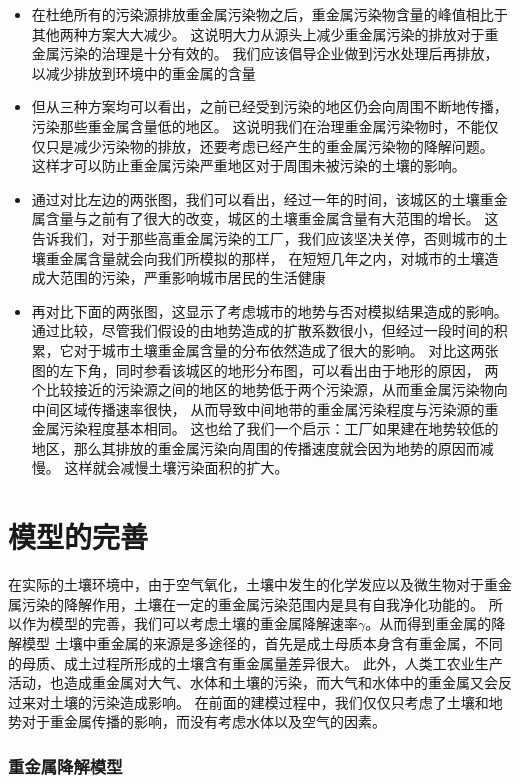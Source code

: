 \documentclass[a4paper]{article}
\begin{document}
\begin{itemize}
\item 在杜绝所有的污染源排放重金属污染物之后，重金属污染物含量的峰值相比于其他两种方案大大减少。
这说明大力从源头上减少重金属污染的排放对于重金属污染的治理是十分有效的。
我们应该倡导企业做到污水处理后再排放，以减少排放到环境中的重金属的含量
\item 但从三种方案均可以看出，之前已经受到污染的地区仍会向周围不断地传播，污染那些重金属含量低的地区。
这说明我们在治理重金属污染物时，不能仅仅只是减少污染物的排放，还要考虑已经产生的重金属污染物的降解问题。
这样才可以防止重金属污染严重地区对于周围未被污染的土壤的影响。
\item 通过对比左边的两张图，我们可以看出，经过一年的时间，该城区的土壤重金属含量与之前有了很大的改变，城区的土壤重金属含量有大范围的增长。
这告诉我们，对于那些高重金属污染的工厂，我们应该坚决关停，否则城市的土壤重金属含量就会向我们所模拟的那样，
在短短几年之内，对城市的土壤造成大范围的污染，严重影响城市居民的生活健康
\item 再对比下面的两张图，这显示了考虑城市的地势与否对模拟结果造成的影响。
通过比较，尽管我们假设的由地势造成的扩散系数很小，但经过一段时间的积累，它对于城市土壤重金属含量的分布依然造成了很大的影响。
对比这两张图的左下角，同时参看该城区的地形分布图，可以看出由于地形的原因，
两个比较接近的污染源之间的地区的地势低于两个污染源，从而重金属污染物向中间区域传播速率很快，
从而导致中间地带的重金属污染程度与污染源的重金属污染程度基本相同。
这也给了我们一个启示：工厂如果建在地势较低的地区，那么其排放的重金属污染向周围的传播速度就会因为地势的原因而减慢。
这样就会减慢土壤污染面积的扩大。
\end{itemize}
\part{模型的完善}
在实际的土壤环境中，由于空气氧化，土壤中发生的化学发应以及微生物对于重金属污染的降解作用，土壤在一定的重金属污染范围内是具有自我净化功能的。
所以作为模型的完善，我们可以考虑土壤的重金属降解速率$\gamma$。从而得到重金属的降解模型
土壤中重金属的来源是多途径的，首先是成土母质本身含有重金属，不同的母质、成土过程所形成的土壤含有重金属量差异很大。
此外，人类工农业生产活动，也造成重金属对大气、水体和土壤的污染，而大气和水体中的重金属又会反过来对土壤的污染造成影响。
在前面的建模过程中，我们仅仅只考虑了土壤和地势对于重金属传播的影响，而没有考虑水体以及空气的因素。
\section{重金属降解模型}
\end{document}
